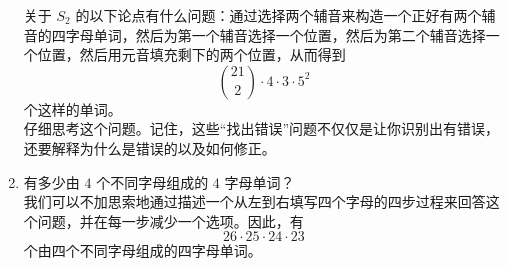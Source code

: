 \begin{example}
\begin{enumerate}
              关于 $S_2$ 的以下论点有什么问题：通过选择两个辅音来构造一个正好有两个辅音的四字母单词，然后为第一个辅音选择一个位置，然后为第二个辅音选择一个位置，然后用元音填充剩下的两个位置，从而得到
              \[{ 21 \choose 2 } \cdot 4 \cdot 3 \cdot 5^2\]
              个这样的单词。\\

              仔细思考这个问题。记住，这些``找出错误''问题不仅仅是让你识别出有错误，还要解释为什么是错误的以及如何修正。
        \item 有多少由 $4$ 个不同字母组成的 $4$ 字母单词？\\
              我们可以不加思索地通过描述一个从左到右填写四个字母的四步过程来回答这个问题，并在每一步减少一个选项。因此，有
              \[26 \cdot 25 \cdot 24 \cdot 23\]
              个由四个不同字母组成的四字母单词。\\


\end{enumerate}
\end{example}
